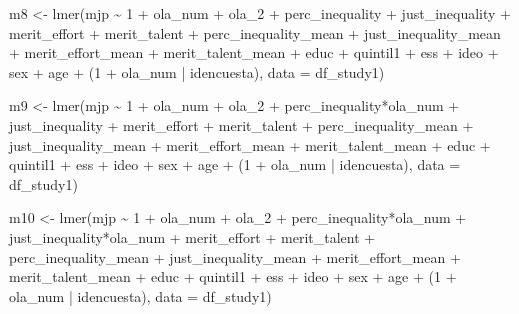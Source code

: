 \documentclass[
  12pt,
  letterpaper,
  DIV=11,
  numbers=noendperiod]{scrartcl}
\newenvironment{Shaded}{\begin{snugshade}}{\end{snugshade}}
\newcommand{\AttributeTok}[1]{\textcolor[rgb]{0.40,0.45,0.13}{#1}}
\newcommand{\DecValTok}[1]{\textcolor[rgb]{0.68,0.00,0.00}{#1}}
\newcommand{\FunctionTok}[1]{\textcolor[rgb]{0.28,0.35,0.67}{#1}}
\newcommand{\NormalTok}[1]{\textcolor[rgb]{0.00,0.23,0.31}{#1}}
\newcommand{\OtherTok}[1]{\textcolor[rgb]{0.00,0.23,0.31}{#1}}
\newcommand{\SpecialCharTok}[1]{\textcolor[rgb]{0.37,0.37,0.37}{#1}}
\begin{document}
\begin{Shaded}
\begin{Highlighting}[]
\NormalTok{m8 }\OtherTok{\textless{}{-}} \FunctionTok{lmer}\NormalTok{(mjp }\SpecialCharTok{\textasciitilde{}} \DecValTok{1} \SpecialCharTok{+}\NormalTok{ ola\_num }\SpecialCharTok{+}\NormalTok{ ola\_2 }\SpecialCharTok{+}\NormalTok{ perc\_inequality }\SpecialCharTok{+}\NormalTok{ just\_inequality }\SpecialCharTok{+}\NormalTok{ merit\_effort }\SpecialCharTok{+}\NormalTok{ merit\_talent }\SpecialCharTok{+}\NormalTok{ perc\_inequality\_mean }\SpecialCharTok{+}\NormalTok{ just\_inequality\_mean }\SpecialCharTok{+}\NormalTok{ merit\_effort\_mean }\SpecialCharTok{+}\NormalTok{ merit\_talent\_mean }\SpecialCharTok{+}\NormalTok{ educ }\SpecialCharTok{+}\NormalTok{ quintil1 }\SpecialCharTok{+}\NormalTok{ ess }\SpecialCharTok{+}\NormalTok{ ideo }\SpecialCharTok{+}\NormalTok{ sex }\SpecialCharTok{+}\NormalTok{ age }\SpecialCharTok{+}\NormalTok{ (}\DecValTok{1} \SpecialCharTok{+}\NormalTok{ ola\_num }\SpecialCharTok{|}\NormalTok{ idencuesta),}
                \AttributeTok{data =}\NormalTok{ df\_study1)}

\NormalTok{m9 }\OtherTok{\textless{}{-}} \FunctionTok{lmer}\NormalTok{(mjp }\SpecialCharTok{\textasciitilde{}} \DecValTok{1} \SpecialCharTok{+}\NormalTok{ ola\_num }\SpecialCharTok{+}\NormalTok{ ola\_2 }\SpecialCharTok{+}\NormalTok{ perc\_inequality}\SpecialCharTok{*}\NormalTok{ola\_num }\SpecialCharTok{+}\NormalTok{ just\_inequality }\SpecialCharTok{+}\NormalTok{ merit\_effort }\SpecialCharTok{+}\NormalTok{ merit\_talent }\SpecialCharTok{+}\NormalTok{ perc\_inequality\_mean }\SpecialCharTok{+}\NormalTok{ just\_inequality\_mean }\SpecialCharTok{+}\NormalTok{ merit\_effort\_mean }\SpecialCharTok{+}\NormalTok{ merit\_talent\_mean }\SpecialCharTok{+}\NormalTok{ educ }\SpecialCharTok{+}\NormalTok{ quintil1 }\SpecialCharTok{+}\NormalTok{ ess }\SpecialCharTok{+}\NormalTok{ ideo }\SpecialCharTok{+}\NormalTok{ sex }\SpecialCharTok{+}\NormalTok{ age }\SpecialCharTok{+}\NormalTok{ (}\DecValTok{1} \SpecialCharTok{+}\NormalTok{ ola\_num }\SpecialCharTok{|}\NormalTok{ idencuesta),}
                \AttributeTok{data =}\NormalTok{ df\_study1)}

\NormalTok{m10 }\OtherTok{\textless{}{-}} \FunctionTok{lmer}\NormalTok{(mjp }\SpecialCharTok{\textasciitilde{}} \DecValTok{1} \SpecialCharTok{+}\NormalTok{ ola\_num }\SpecialCharTok{+}\NormalTok{ ola\_2 }\SpecialCharTok{+}\NormalTok{ perc\_inequality}\SpecialCharTok{*}\NormalTok{ola\_num }\SpecialCharTok{+}\NormalTok{ just\_inequality}\SpecialCharTok{*}\NormalTok{ola\_num }\SpecialCharTok{+}\NormalTok{ merit\_effort }\SpecialCharTok{+}\NormalTok{ merit\_talent }\SpecialCharTok{+}\NormalTok{ perc\_inequality\_mean }\SpecialCharTok{+}\NormalTok{ just\_inequality\_mean }\SpecialCharTok{+}\NormalTok{ merit\_effort\_mean }\SpecialCharTok{+}\NormalTok{ merit\_talent\_mean }\SpecialCharTok{+}\NormalTok{ educ }\SpecialCharTok{+}\NormalTok{ quintil1 }\SpecialCharTok{+}\NormalTok{ ess }\SpecialCharTok{+}\NormalTok{ ideo }\SpecialCharTok{+}\NormalTok{ sex }\SpecialCharTok{+}\NormalTok{ age }\SpecialCharTok{+}\NormalTok{ (}\DecValTok{1} \SpecialCharTok{+}\NormalTok{ ola\_num }\SpecialCharTok{|}\NormalTok{ idencuesta),}
                \AttributeTok{data =}\NormalTok{ df\_study1)}


\end{Highlighting}
\end{Shaded}
\end{document}
